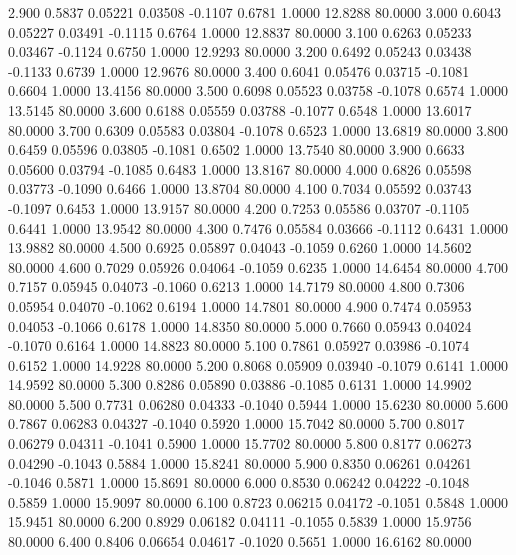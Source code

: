    2.900   0.5837   0.05221   0.03508  -0.1107   0.6781   1.0000  12.8288  80.0000
   3.000   0.6043   0.05227   0.03491  -0.1115   0.6764   1.0000  12.8837  80.0000
   3.100   0.6263   0.05233   0.03467  -0.1124   0.6750   1.0000  12.9293  80.0000
   3.200   0.6492   0.05243   0.03438  -0.1133   0.6739   1.0000  12.9676  80.0000
   3.400   0.6041   0.05476   0.03715  -0.1081   0.6604   1.0000  13.4156  80.0000
   3.500   0.6098   0.05523   0.03758  -0.1078   0.6574   1.0000  13.5145  80.0000
   3.600   0.6188   0.05559   0.03788  -0.1077   0.6548   1.0000  13.6017  80.0000
   3.700   0.6309   0.05583   0.03804  -0.1078   0.6523   1.0000  13.6819  80.0000
   3.800   0.6459   0.05596   0.03805  -0.1081   0.6502   1.0000  13.7540  80.0000
   3.900   0.6633   0.05600   0.03794  -0.1085   0.6483   1.0000  13.8167  80.0000
   4.000   0.6826   0.05598   0.03773  -0.1090   0.6466   1.0000  13.8704  80.0000
   4.100   0.7034   0.05592   0.03743  -0.1097   0.6453   1.0000  13.9157  80.0000
   4.200   0.7253   0.05586   0.03707  -0.1105   0.6441   1.0000  13.9542  80.0000
   4.300   0.7476   0.05584   0.03666  -0.1112   0.6431   1.0000  13.9882  80.0000
   4.500   0.6925   0.05897   0.04043  -0.1059   0.6260   1.0000  14.5602  80.0000
   4.600   0.7029   0.05926   0.04064  -0.1059   0.6235   1.0000  14.6454  80.0000
   4.700   0.7157   0.05945   0.04073  -0.1060   0.6213   1.0000  14.7179  80.0000
   4.800   0.7306   0.05954   0.04070  -0.1062   0.6194   1.0000  14.7801  80.0000
   4.900   0.7474   0.05953   0.04053  -0.1066   0.6178   1.0000  14.8350  80.0000
   5.000   0.7660   0.05943   0.04024  -0.1070   0.6164   1.0000  14.8823  80.0000
   5.100   0.7861   0.05927   0.03986  -0.1074   0.6152   1.0000  14.9228  80.0000
   5.200   0.8068   0.05909   0.03940  -0.1079   0.6141   1.0000  14.9592  80.0000
   5.300   0.8286   0.05890   0.03886  -0.1085   0.6131   1.0000  14.9902  80.0000
   5.500   0.7731   0.06280   0.04333  -0.1040   0.5944   1.0000  15.6230  80.0000
   5.600   0.7867   0.06283   0.04327  -0.1040   0.5920   1.0000  15.7042  80.0000
   5.700   0.8017   0.06279   0.04311  -0.1041   0.5900   1.0000  15.7702  80.0000
   5.800   0.8177   0.06273   0.04290  -0.1043   0.5884   1.0000  15.8241  80.0000
   5.900   0.8350   0.06261   0.04261  -0.1046   0.5871   1.0000  15.8691  80.0000
   6.000   0.8530   0.06242   0.04222  -0.1048   0.5859   1.0000  15.9097  80.0000
   6.100   0.8723   0.06215   0.04172  -0.1051   0.5848   1.0000  15.9451  80.0000
   6.200   0.8929   0.06182   0.04111  -0.1055   0.5839   1.0000  15.9756  80.0000
   6.400   0.8406   0.06654   0.04617  -0.1020   0.5651   1.0000  16.6162  80.0000
